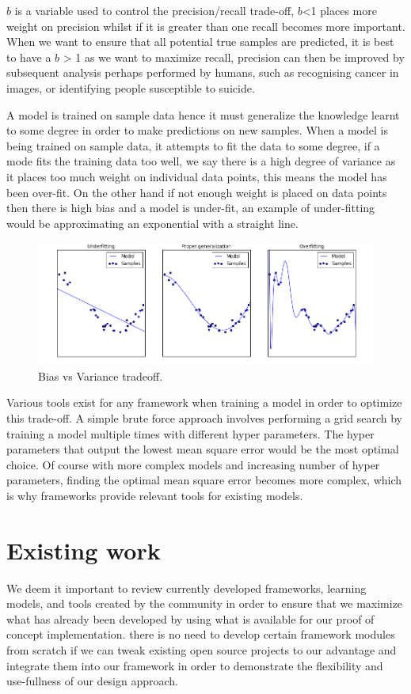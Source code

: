 \(b\) is a variable used to control the precision/recall trade-off, \(b\)<1 places more weight on precision whilst if it is greater than one recall becomes more important. When we want to ensure that all potential true samples are predicted, it is best to have a \(b\) > 1 as we want to maximize recall, precision can then be improved by subsequent analysis perhaps performed by humans, such as recognising cancer in images, or identifying people susceptible to suicide.

A model is trained on sample data hence it must generalize the knowledge learnt to some degree in order to make predictions on new samples. When a model is being trained on sample data, it attempts to fit the data to some degree, if a mode fits the training data too well, we say there is a high degree of variance as it places too much weight on individual data points, this means the model has been over-fit. On the other hand if not enough weight is placed on data points then there is high bias and a model is under-fit, an example of under-fitting would be approximating an exponential with a straight line.
\begin{figure}[h]
    \centering
    \includegraphics[width=\linewidth]{images/Selection_019}
    \caption{Bias vs Variance tradeoff.}
    \label{fig:bvtradeoff}
\end{figure}

Various tools exist for any framework when training a model in order to optimize this trade-off. A simple brute force approach involves performing a grid search by training a model multiple times with different hyper parameters. The hyper parameters that output the lowest mean square error would be the most optimal choice. Of course with more complex models and increasing number of hyper parameters, finding the optimal mean square error becomes more complex, which is why frameworks provide relevant tools for existing models.

\newpage


\section{Existing work}\label{background:Existing Work}
We deem it important to review currently developed frameworks, learning models, and tools created by the community in order to ensure that we maximize what has already been developed by using what is available for our proof of concept implementation. there is no need to develop certain framework modules from scratch if we can tweak existing open source projects to our advantage and integrate them into our framework in order to demonstrate the flexibility and use-fullness of our design approach.


